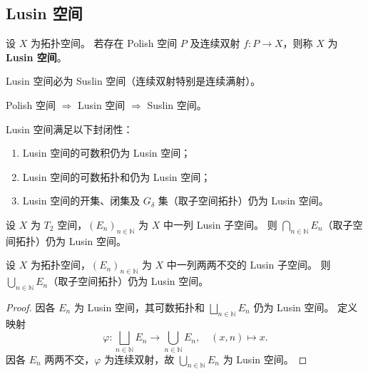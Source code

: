 \documentclass[lang=cn,a4paper,newtx,figureplace=section,tableplace=section]{elegantbook}
\begin{document}
\subsection{Lusin 空间}

\begin{definition}[Lusin 空间]\label{def:lusin-space}
  设 $X$ 为拓扑空间。
  若存在 Polish 空间 $P$ 及连续双射 $f:P\to X$，则称 $X$ 为 \textbf{Lusin 空间}。
\end{definition}

\begin{remark}
  Lusin 空间必为 Suslin 空间（连续双射特别是连续满射）。
\end{remark}

\begin{example}
  Polish 空间 $\Rightarrow$ Lusin 空间 $\Rightarrow$ Suslin 空间。
\end{example}

\begin{proposition}\label{prop:lusin-closed-properties}
  Lusin 空间满足以下封闭性：
  \begin{enumerate}
    \item Lusin 空间的可数积仍为 Lusin 空间；
    \item Lusin 空间的可数拓扑和仍为 Lusin 空间；
    \item Lusin 空间的开集、闭集及 $G_\delta$ 集（取子空间拓扑）仍为 Lusin 空间。
  \end{enumerate}
\end{proposition}

\begin{proposition}\label{prop:lusin-countable-intersection}
  设 $X$ 为 $T_2$ 空间，$(E_n)_{n\in\mathbb{N}}$ 为 $X$ 中一列 Lusin 子空间。
  则 $\bigcap_{n\in\mathbb{N}}E_n$（取子空间拓扑）仍为 Lusin 空间。
\end{proposition}

\begin{proposition}\label{prop:lusin-disjoint-union}
  设 $X$ 为拓扑空间，$(E_n)_{n\in\mathbb{N}}$ 为 $X$ 中一列两两不交的 Lusin 子空间。
  则 $\bigcup_{n\in\mathbb{N}}E_n$（取子空间拓扑）仍为 Lusin 空间。
\end{proposition}

\begin{proof}
  因各 $E_n$ 为 Lusin 空间，其可数拓扑和 $\bigsqcup_{n\in\mathbb{N}}E_n$ 仍为 Lusin 空间。
  定义映射
  \[
    \varphi:\bigsqcup_{n\in\mathbb{N}}E_n\to\bigcup_{n\in\mathbb{N}}E_n,\quad (x,n)\mapsto x.
  \]
  因各 $E_n$ 两两不交，$\varphi$ 为连续双射，故 $\bigcup_{n\in\mathbb{N}}E_n$ 为 Lusin 空间。
\end{proof}
\end{document}

